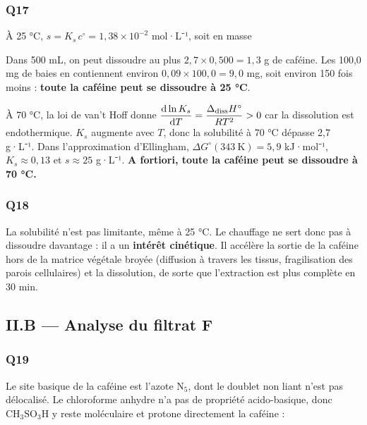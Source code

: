 \documentclass[11pt,a4paper]{article}
\newcommand{\equationajustee}[1]{%
  \sbox{\boiteequation}{$\displaystyle #1$}%
  \ifdim\wd\boiteequation>\linewidth
    \[\resizebox{\linewidth}{!}{\usebox{\boiteequation}}\]%
  \else
    \[#1\]%
  \fi}
\begin{document}
\hypertarget{q17}{%
\subsubsection{Q17}\label{q17}}

À 25 °C, \(s = K_s\,c^\circ = 1{,}38\times10^{-2}\) mol·L⁻¹, soit en masse

\equationajustee{\boxed{s = 1{,}38\times10^{-2}\times194{,}2 = 2{,}7\ \mathrm{g\cdot L^{-1}}}}

Dans 500 mL, on peut dissoudre au plus \(2{,}7\times0{,}500 = 1{,}3\) g de caféine. Les 100,0 mg de baies en contiennent environ \(0{,}09\times100{,}0 = 9{,}0\) mg, soit environ 150 fois moins : \textbf{toute la caféine peut se dissoudre à 25 °C}.

À 70 °C, la loi de van't Hoff donne \(\dfrac{\mathrm d\ln K_s}{\mathrm dT} = \dfrac{\Delta_{\rm diss}H^\circ}{RT^2} > 0\) car la dissolution est endothermique. \(K_s\) augmente avec \(T\), donc la solubilité à 70 °C dépasse 2,7 g·L⁻¹. Dans l'approximation d'Ellingham, \(\Delta G^\circ(343\ \mathrm K) = 5{,}9\) kJ·mol⁻¹, \(K_s \approx 0{,}13\) et \(s \approx 25\) g·L⁻¹. \textbf{A fortiori, toute la caféine peut se dissoudre à 70 °C.}

\hypertarget{q18}{%
\subsubsection{Q18}\label{q18}}

La solubilité n'est pas limitante, même à 25 °C. Le chauffage ne sert donc pas à dissoudre davantage : il a un \textbf{intérêt cinétique}. Il accélère la sortie de la caféine hors de la matrice végétale broyée (diffusion à travers les tissus, fragilisation des parois cellulaires) et la dissolution, de sorte que l'extraction est plus complète en 30 min.

\hypertarget{ii.b-analyse-du-filtrat-f}{%
\subsection{II.B --- Analyse du filtrat F}\label{ii.b-analyse-du-filtrat-f}}

\hypertarget{q19}{%
\subsubsection{Q19}\label{q19}}

Le site basique de la caféine est l'azote \(\mathrm{N_5}\), dont le doublet non liant n'est pas délocalisé. Le chloroforme anhydre n'a pas de propriété acido-basique, donc \(\mathrm{CH_3SO_3H}\) y reste moléculaire et protone directement la caféine :
\end{document}
